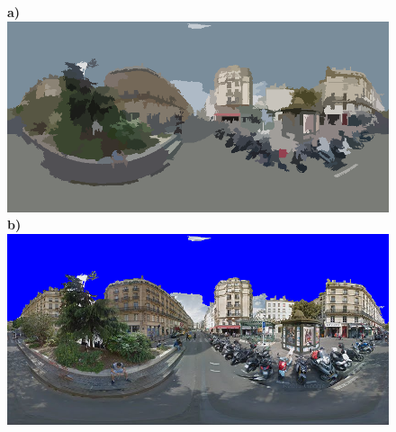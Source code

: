 \documentclass{article}
\begin{document}
\clearpage %

\begin{figure}
\centering    
\textbf{\scriptsize{a)}}\includegraphics[scale=0.26]{Images/2/panorama-JtVHmEl7WCiz1xJ0bcJpBg-1_seg.png} 
\textbf{\scriptsize{b)}}\includegraphics[scale=0.26]{Images/2/panorama-JtVHmEl7WCiz1xJ0bcJpBg-1_ms_sky_mark.png} 
\end{figure} 

\clearpage %
\end{document}
